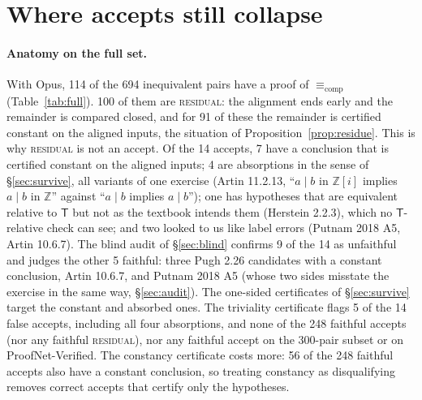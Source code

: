\documentclass[10pt]{article}
\theoremstyle{definition}
\newcommand{\T}{\mathsf{T}}
\newcommand{\Ecomp}{\mathrel{\equiv_{\mathrm{comp}}}}
\newcommand{\V}[1]{\textsc{#1}}
\begin{document}
\section{Where accepts still collapse}\label{sec:survive-exp}

\paragraph{Anatomy on the full set.} With Opus, 114 of the 694 inequivalent pairs have a proof
of $\Ecomp$ (Table~\ref{tab:full}). 100 of them are \V{residual}: the alignment ends early and
the remainder is compared closed, and for 91 of these the remainder is certified constant on the
aligned inputs, the situation of Proposition~\ref{prop:residue}. This is why \V{residual} is not
an accept. Of the 14 accepts, 7 have a conclusion that is certified
constant on the aligned inputs; 4 are absorptions in the sense of \S\ref{sec:survive}, all
variants of one exercise (Artin 11.2.13, ``$a\mid b$ in $\mathbb Z[i]$ implies $a\mid b$ in $\mathbb Z$''
against ``$a\mid b$ implies $a\mid b$''); one has hypotheses that are equivalent relative to $\T$ but
not as the textbook intends them (Herstein 2.2.3), which no $\T$-relative check can see; and two
looked to us like label errors (Putnam 2018 A5, Artin 10.6.7). The blind audit of
\S\ref{sec:blind} confirms 9 of the 14 as unfaithful and judges the other 5 faithful: three Pugh
2.26 candidates with a constant conclusion, Artin 10.6.7, and Putnam 2018 A5 (whose two sides
misstate the exercise in the same way, \S\ref{sec:audit}). The one-sided certificates of
\S\ref{sec:survive} target the constant and absorbed ones. The triviality certificate flags 5 of
the 14 false accepts, including all four absorptions, and none of the 248 faithful accepts (nor
any faithful \V{residual}), nor any faithful accept on the 300-pair subset or on
ProofNet-Verified. The constancy certificate costs
more: 56 of the 248 faithful accepts also have a constant conclusion, so treating constancy
as disqualifying removes correct accepts that certify only the hypotheses.
\end{document}

